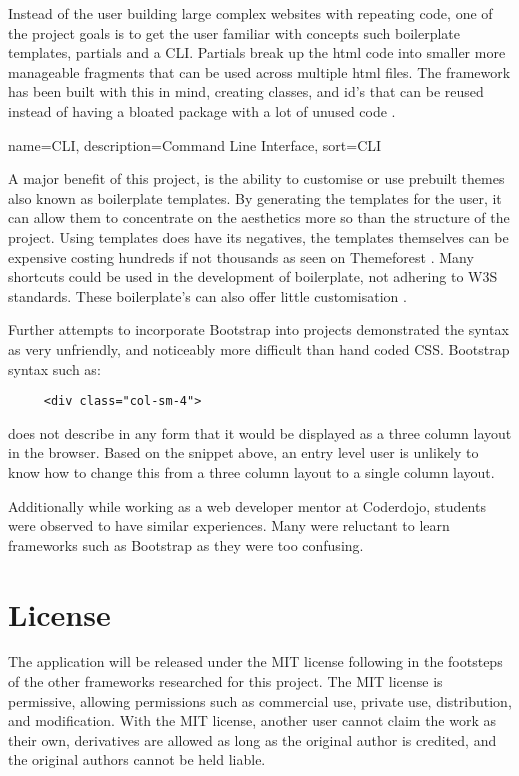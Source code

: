 Instead of the user building large complex websites with repeating code, one of the project goals is to get the user familiar with concepts such boilerplate templates, partials and a \gls{CLI}. Partials break up the html code into smaller more manageable fragments that can be used across multiple html files. The framework has been built with this in mind, creating classes, and id's that can be reused instead of having a bloated package with a lot of unused code \citep{KAR15}.

{
  name={CLI},
  description={Command Line Interface},
  sort=CLI
}

A major benefit of this project, is the ability to customise or use prebuilt themes also known as boilerplate templates. By generating the templates for the user, it can allow them to concentrate on the aesthetics more so than the structure of the project. Using templates does have its negatives, the templates themselves can be expensive costing hundreds if not thousands as seen on Themeforest \citep{THEME17}. Many shortcuts could be used in the development of boilerplate, not adhering to W3S standards. These boilerplate's can also offer little customisation \citep{NATH16}.

Further attempts to incorporate Bootstrap into projects demonstrated the syntax as very unfriendly, and noticeably more difficult than hand coded \gls{CSS}. Bootstrap syntax such as: \begin{lstlisting}
	 <div class="col-sm-4">\end{lstlisting} 
	 does not describe in any form that it would be displayed as a three column layout in the browser. Based on the snippet above, an entry level user is unlikely to know how to change this from a three column layout to a single column layout. 
	 
Additionally while working as a web developer mentor at Coderdojo, students were observed to have similar experiences. Many were reluctant to learn frameworks such as Bootstrap as they were too confusing.

%
\section*{License}
The application will be released under the MIT license following in the footsteps of the other frameworks researched for this project. The MIT license is permissive, allowing permissions such as commercial use, private use, distribution, and modification. With the MIT license, another user cannot claim the work as their own, derivatives are allowed as long as the original author is credited, and the original authors cannot be held liable.

